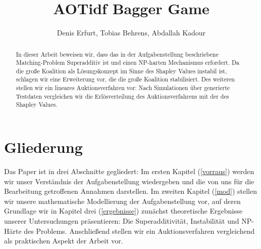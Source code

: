 \documentclass[sigconf]{acmart}
\theoremstyle{break}
\begin{document}
\title{AOTidf Bagger Game}
\author{Denis Erfurt, Tobias Behrens, Abdallah Kadour}

\begin{abstract}
  \noindent
  In dieser Arbeit beweisen wir, dass das in der Aufgabenstellung beschriebene Matching-Problem Superadditiv ist und einen NP-harten Mechanismus erfordert. Da die große Koalition als Lösungskonzept im Sinne des Shapley Values instabil ist, schlagen wir eine Erweiterung vor, die die große Koalition stabilisiert. Des weiteren stellen wir ein lineares Auktionsverfahren vor: Nach Simulationen über generierte Testdaten vergleichen wir die Erlösverteilung des Auktionsverfahrens mit der des Shapley Values.
\end{abstract}

\maketitle

\section{Gliederung}
Das Paper ist in drei Abschnitte gegliedert: Im ersten Kapitel (\ref{vorraus}) werden wir unser Verständnis der Aufgabenstellung wiedergeben und die von uns für die Bearbeitung getroffenen Annahmen darstellen. Im zweiten Kapitel (\ref{mod}) stellen wir unsere mathematische Modellierung der Aufgabenstellung vor, auf deren Grundlage wir in Kapitel drei (\ref{ergebnisse}) zunächst theoretische Ergebnisse unserer Untersuchungen präsentieren: Die Superadditivität, Instabilität und NP-Härte des Problems. Anschließend stellen wir ein Auktionsverfahren vergleichend als praktischen Aspekt der Arbeit vor. 
\end{document}
